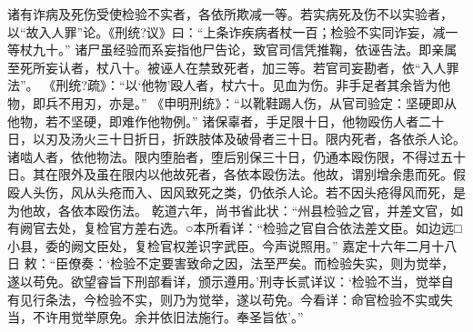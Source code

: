 \documentclass[12pt,UTF8]{ctexbook}
\begin{document}
诸有诈病及死伤受使检验不实者，各依所欺减一等。若实病死及伤不以实验者，以“故入人罪”论。《刑统?议》曰：“上条诈疾病者杖一百；检验不实同诈妄，减一等杖九十。”
诸尸虽经验而系妄指他尸告论，致官司信凭推鞠，依诬告法。即亲属至死所妄认者，杖八十。被诬人在禁致死者，加三等。若官司妄勘者，依“入人罪法”。
《刑统?疏》：“以‘他物’殴人者，杖六十。见血为伤。非手足者其余皆为他物，即兵不用刃，亦是。”
《申明刑统》：“以靴鞋踢人伤，从官司验定：坚硬即从他物，若不坚硬，即难作他物例。”
诸保辜者，手足限十日，他物殴伤人者二十日，以刃及汤火三十日折日，折跌肢体及破骨者三十日。限内死者，各依杀人论。诸啮人者，依他物法。限内堕胎者，堕后别保三十日，仍通本殴伤限，不得过五十日。其在限外及虽在限内以他故死者，各依本殴伤法。他故，谓别增余患而死。假殴人头伤，风从头疮而入、因风致死之类，仍依杀人论。若不因头疮得风而死，是为他故，各依本殴伤法。
乾道六年，尚书省此状：“州县检验之官，并差文官，如有阙官去处，复检官方差右选。○本所看详：“检验之官自合依法差文臣。如边远□小县，委的阙文臣处，复检官权差识字武臣。今声说照用。”
嘉定十六年二月十八日
敕：“臣僚奏：‘检验不定要害致命之因，法至严矣。而检验失实，则为觉举，遂以苟免。欲望睿旨下刑部看详，颁示遵用。’刑寺长贰详议：‘检验不当，觉举自有见行条法，今检验不实，则乃为觉举，遂以苟免。今看详：命官检验不实或失当，不许用觉举原免。余并依旧法施行。奉圣旨依’。”
\end{document}
